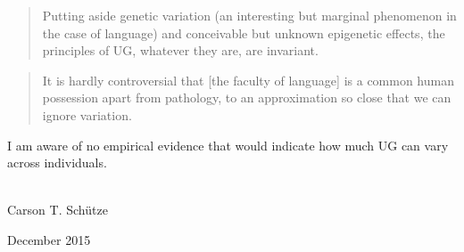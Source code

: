 \begin{refsection}
\begin{quote}
Putting aside genetic variation (an interesting but marginal phenomenon in the case of language) and conceivable but unknown epigenetic effects, the principles of UG, whatever they are, are invariant. \citep[35]{Chomsky2013}
\end{quote}

\begin{quote}
It is hardly controversial that [the faculty of language] is a common human possession apart from pathology, to an approximation so close that we can ignore variation. \citep[138]{Chomsky2008}
\end{quote}

\noindent I am aware of no empirical evidence that would indicate how much UG can vary across individuals.\\\\
\begin{minipage}{.45\linewidth}
	\begin{flushleft}
		\noindent Carson T. Schütze 
	\end{flushleft}
\end{minipage}
\begin{minipage}{.54\linewidth}
	\begin{flushright}
		\noindent December 2015
	\end{flushright}
\end{minipage}
\nocite{Phillips2006}
\printbibliography[heading=prefacebib]
\end{refsection}